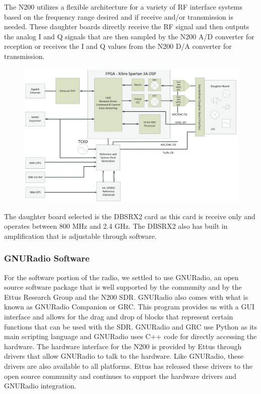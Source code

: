 The N200 utilizes a flexible architecture for a variety of RF interface systems based on the frequency range desired and if receive and/or transmission is needed.  These daughter boards directly receive the RF signal and then outputs the analog I and Q signals that are then sampled by the N200 A/D converter for reception or receives the I and Q values from the N200 D/A converter for transmission. 

{\begin{figure}[h!tb] 
\centering
\includegraphics[width=14cm]{Images/n200_block_edited}
\label{N200_block}
\end{figure}
}

The daughter board selected is the DBSRX2 card as this card is receive only and operates between 800 MHz and 2.4 GHz.  The DBSRX2 also has built in amplification that is adjustable through software.

\subsubsection{GNURadio Software}

For the software portion of the radio, we settled to use GNURadio, an open source software package that is well supported by the community and by the Ettus Research Group and the N200 SDR.  GNURadio also comes with what is known as GNURadio Companion or GRC.  This program provides us with a GUI interface and allows for the drag and drop of blocks that represent certain functions that can be used with the SDR.  GNURadio and GRC use Python as its main scripting language and GNURadio uses C++ code for directly accessing the hardware.  The hardware interface for the N200 is provided by Ettus through drivers that allow GNURadio to talk to the hardware.  Like GNURadio, these drivers are also available to all platforms.  Ettus has released these drivers to the open source community and continues to support the hardware drivers and GNURadio integration.

